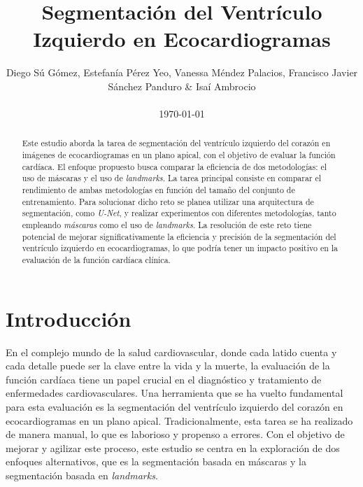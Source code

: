 \documentclass[runningheads]{llncs}
\begin{document}
%
\title{Segmentación del Ventrículo Izquierdo en Ecocardiogramas}
%
%
\author{Diego Sú Gómez, Estefanía Pérez Yeo, Vanessa Méndez Palacios, Francisco Javier Sánchez Panduro \& Isaí Ambrocio \\ \ \\
\today}
%
%
%
\maketitle             %
%
\begin{abstract}
Este estudio aborda la tarea de segmentación del ventrículo izquierdo del corazón en imágenes de ecocardiogramas en un plano apical, con el objetivo de evaluar la función cardíaca. El enfoque propuesto busca comparar la eficiencia de dos metodologías: el uso de máscaras y el uso de \textit{landmarks}. La tarea principal consiste en comparar el rendimiento de ambas metodologías en función del tamaño del conjunto de entrenamiento. Para solucionar dicho reto se planea utilizar una arquitectura de segmentación, como \textit{U-Net}, y realizar experimentos con diferentes metodologías, tanto empleando \textit{máscaras} como el uso de \textit{landmarks}. La resolución de este reto tiene potencial de mejorar significativamente la eficiencia y precisión de la segmentación del ventrículo izquierdo en ecocardiogramas, lo que podría tener un impacto positivo en la evaluación de la función cardíaca clínica.

\end{abstract}
%
%
%
\newpage
\section{Introducción}
En el complejo mundo de la salud cardiovascular, donde cada latido cuenta y cada detalle puede ser la clave entre la vida y la muerte, la evaluación de la función cardíaca tiene un papel crucial en el diagnóstico y tratamiento de enfermedades cardiovasculares. Una herramienta que se ha vuelto fundamental para esta evaluación es la segmentación del ventrículo izquierdo del corazón en ecocardiogramas en un plano apical. Tradicionalmente, esta tarea se ha realizado de manera manual, lo que es laborioso y propenso a errores. Con el objetivo de mejorar y agilizar este proceso, este estudio se centra en la exploración de dos enfoques alternativos, que es la segmentación basada en máscaras y la segmentación basada en \textit{landmarks}.
\end{document}
